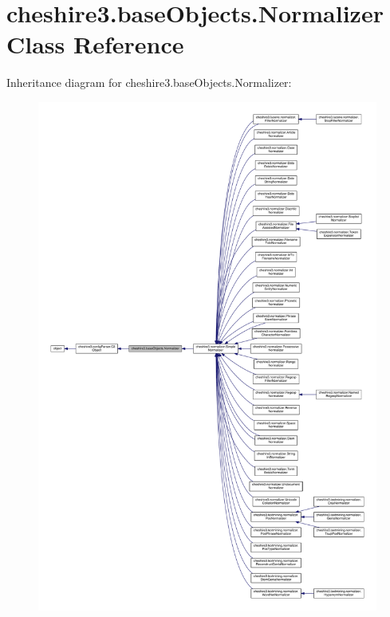\hypertarget{classcheshire3_1_1base_objects_1_1_normalizer}{\section{cheshire3.\-base\-Objects.\-Normalizer Class Reference}
\label{classcheshire3_1_1base_objects_1_1_normalizer}
}


Inheritance diagram for cheshire3.\-base\-Objects.\-Normalizer\-:
\nopagebreak
\begin{figure}[H]
\begin{center}
\leavevmode
\includegraphics[width=350pt]{classcheshire3_1_1base_objects_1_1_normalizer__inherit__graph}
\end{center}
\end{figure}


